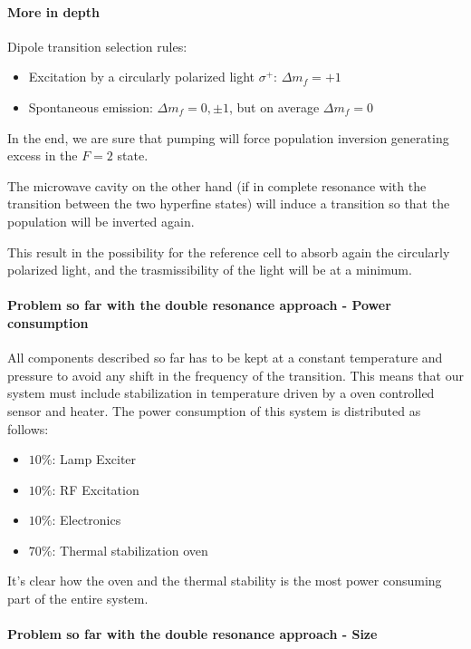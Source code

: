 \paragraph{More in depth}

Dipole transition selection rules:
\begin{itemize}
    \item Excitation by a circularly polarized light $\sigma^+$: $\Delta m_f = +1$
    \item Spontaneous emission: $\Delta m_f = 0, \pm 1$, but on average $\Delta m_f = 0$
\end{itemize}

In the end, we are sure that pumping will force population inversion generating excess in the $F=2$ state.

The microwave cavity on the other hand (if in complete resonance with the transition between the two hyperfine states) will induce a transition so that the population will be inverted again.

This result in the possibility for the reference cell to absorb again the circularly polarized light, and the trasmissibility of the light will be at a minimum.

\paragraph{Problem so far with the double resonance approach - Power consumption}

All components described so far has to be kept at a constant temperature and pressure to avoid any shift in the frequency of the transition.
This means that our system must include stabilization in temperature driven by a oven controlled sensor and heater.
The power consumption of this system is distributed as follows:

\begin{itemize}
    \item $10\%$: Lamp Exciter
    \item $10\%$: RF Excitation
    \item $10\%$: Electronics
    \item $70\%$: Thermal stabilization oven
\end{itemize}

It's clear how the oven and the thermal stability is the most power consuming part of the entire system.

\paragraph{Problem so far with the double resonance approach - Size}

